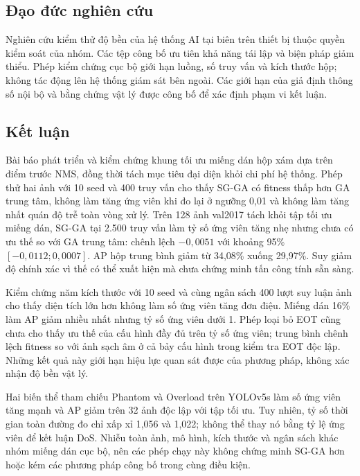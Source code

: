 \documentclass[a4paper,fleqn]{cas-dc}
\begin{document}
\subsection{Đạo đức nghiên cứu}

Nghiên cứu kiểm thử độ bền của hệ thống AI tại biên trên thiết bị thuộc quyền kiểm soát của nhóm. Các tệp công bố ưu tiên khả năng tái lập và biện pháp giảm thiểu. Phép kiểm chứng cục bộ giới hạn luồng, số truy vấn và kích thước hộp; không tác động lên hệ thống giám sát bên ngoài. Các giới hạn của giả định thông số nội bộ và bằng chứng vật lý được công bố để xác định phạm vi kết luận.

\subsection{Kết luận}

Bài báo phát triển và kiểm chứng khung tối ưu miếng dán hộp xám dựa trên điểm trước NMS, đồng thời tách mục tiêu đại diện khỏi chi phí hệ thống. Phép thử hai ảnh với 10 seed và 400 truy vấn cho thấy SG-GA có fitness thấp hơn GA trung tâm, không làm tăng ứng viên khi đo lại ở ngưỡng 0,01 và không làm tăng nhất quán độ trễ toàn vòng xử lý. Trên 128 ảnh val2017 tách khỏi tập tối ưu miếng dán, SG-GA tại 2.500 truy vấn làm tỷ số ứng viên tăng nhẹ nhưng chưa có ưu thế so với GA trung tâm: chênh lệch $-0{,}0051$ với khoảng 95\% $[-0{,}0112;0{,}0007]$. AP hộp trung bình giảm từ 34,08\% xuống 29,97\%. Suy giảm độ chính xác vì thế có thể xuất hiện mà chưa chứng minh tấn công tính sẵn sàng.

Kiểm chứng năm kích thước với 10 seed và cùng ngân sách 400 lượt suy luận ảnh cho thấy diện tích lớn hơn không làm số ứng viên tăng đơn điệu. Miếng dán 16\% làm AP giảm nhiều nhất nhưng tỷ số ứng viên dưới 1. Phép loại bỏ EOT cũng chưa cho thấy ưu thế của cấu hình đầy đủ trên tỷ số ứng viên; trung bình chênh lệch fitness so với ảnh sạch âm ở cả bảy cấu hình trong kiểm tra EOT độc lập. Những kết quả này giới hạn hiệu lực quan sát được của phương pháp, không xác nhận độ bền vật lý.

Hai biến thể tham chiếu Phantom và Overload trên YOLOv5s làm số ứng viên tăng mạnh và AP giảm trên 32 ảnh độc lập với tập tối ưu. Tuy nhiên, tỷ số thời gian toàn đường đo chỉ xấp xỉ 1,056 và 1,022; không thể thay nó bằng tỷ lệ ứng viên để kết luận DoS. Nhiễu toàn ảnh, mô hình, kích thước và ngân sách khác nhóm miếng dán cục bộ, nên các phép chạy này không chứng minh SG-GA hơn hoặc kém các phương pháp công bố trong cùng điều kiện.
\end{document}
